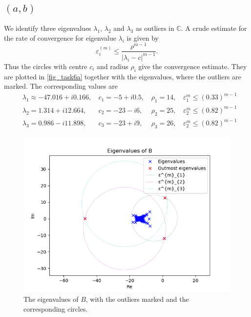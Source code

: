 \subsection{$(a,b)$}

We identify three eigenvalues $\lambda_{1}$, $\lambda_{2}$ and $\lambda_{3}$ as outliers in $\mathbb{C}$. A crude estimate for the rate of convergence for eigenvalue $\lambda_{i}$ is given by
\begin{equation*}
  \varepsilon_{i}^{(m)}\leq \frac{\rho^{m-1}}{|\lambda_{i} - c|^{m-1}}.
\end{equation*}
Thus the circles with centre $c_{i}$ and radius $\rho_{i}$ give the convergence estimate. They are plotted in \ref{fig_task6a} together with the eigenvalues, where the outliers are marked. The corresponding values are
\begin{align*}
&\lambda_{1} \approx -47.016 + i 0.166,\,&c_{1} = -5+i0.5,\,&\rho_{1} = 14,\,&\varepsilon_{1}^{m}\leq (0.33)^{m-1}\\ &\lambda_{2} = 1.314 + i 12.664,\,&c_{2} = -23-i6,\,&\rho_{2} = 25,\,&\varepsilon_{2}^{m}\leq (0.82)^{m-1} \\ &\lambda_{3} = 0.986 - i11.898,\,&c_{3} = -23+i9,\,&\rho_{3} = 26,\,&\varepsilon_{2}^{m}\leq (0.82)^{m-1}
\end{align*}


\begin{figure}[h!]
\centering
\includegraphics[scale=0.8]{../task6/task6a.png}
\caption{The eigenvalues of $B$, with the outliers marked and the corresponding circles.}
\label{fig:task6a}
\end{figure}

